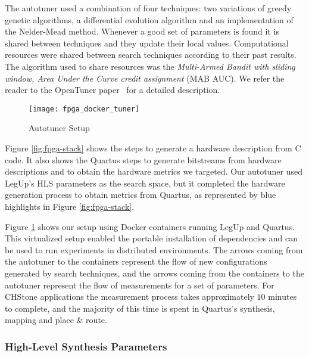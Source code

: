 The autotuner used a combination of four techniques: two variations of greedy
genetic algorithms, a differential evolution algorithm and an implementation of
the Nelder-Mead method.  Whenever a good set of parameters is found it is
shared between techniques and they update their local values. Computational
resources were shared between search techniques according to their past
results. The algorithm used to share resources was the \textit{Multi-Armed
Bandit with sliding window, Area Under the Curve credit assignment} (MAB AUC).
We refer the reader to the OpenTuner paper~\cite{ansel2014opentuner} for a
detailed description.

\begin{figure}[htpb]
    \centering
    \texttt{[image: fpga\_docker\_tuner]}
    \caption{Autotuner Setup}
    \label{fig:autotuner}
\end{figure}

Figure \ref{fig:fpga-stack} shows the steps to generate a hardware description
from C code. It also shows the Quartus steps to generate bitstreams from
hardware descriptions and to obtain the hardware metrics we targeted. Our
autotuner used LegUp's HLS parameters as the search space, but it completed the
hardware generation process to obtain metrics from Quartus, as represented by
blue highlights in Figure \ref{fig:fpga-stack}.

Figure \ref{fig:autotuner} shows our setup using Docker containers running
LegUp and Quartus. This virtualized setup enabled the portable installation of
dependencies and can be used to run experiments in distributed environments.
The arrows coming from the autotuner to the containers represent the flow of
new configurations generated by search techniques, and the arrows coming from
the containers to the autotuner represent the flow of measurements for a set of
parameters. For CHStone applications the measurement process takes
approximately $10$ minutes to complete, and the majority of this time is spent
in Quartus's synthesis, mapping and place \& route.

\subsubsection{High-Level Synthesis Parameters}

